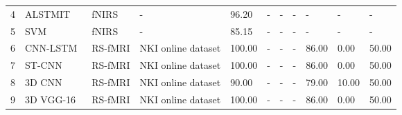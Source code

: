 \begin{table*}
\begin{tabular}{l|l|l|l|lllllll}
4                                       & ALSTMIT~\cite{ 2020DISTINGUISHING }           & fNIRS                                              & -                                            & 96.20                        & -                            & -                             & -                          & -                               & -                               & -                       \\
5                                       & SVM~\cite{2017Automatic}                      & fNIRS                                              & -                                            & 85.15                        & -                            & -                             & -                          & -                               & -                               & -                       \\
\hline
6                                       & CNN-LSTM~\cite{mousavian2020depression}      & RS-fMRI                                            & NKI online dataset                           & 100.00                       & -                            & -                             & -                          & 86.00                           & 0.00                            & 50.00                   \\
7                                       & ST-CNN~\cite{mousavian2020depression}        & RS-fMRI                                            & NKI online dataset                           & 100.00                       & -                            & -                             & -                          & 86.00                           & 0.00                            & 50.00                   \\
8                                       & 3D CNN~\cite{mousavian2020depression}        & RS-fMRI                                            & NKI online dataset                           & 90.00                        & -                            & -                             & -                          & 79.00                           & 10.00                           & 50.00                   \\
9                                       & 3D VGG-16~\cite{mousavian2020depression}     & RS-fMRI                                            & NKI online dataset                           & 100.00                       & -                            & -                             & -                          & 86.00                           & 0.00                            & 50.00                   \\

\end{tabular}
\end{table*}
